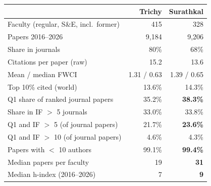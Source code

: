 \begin{tabular}{@{}lrr@{}}
\toprule
 & Trichy & Surathkal \\
\midrule
Faculty (regular, S\&E, incl.\ former) & 415 & 328 \\
Papers 2016--2026 & 9{,}184 & 9{,}206 \\
Share in journals & 80\% & 68\% \\
Citations per paper (raw) & 15.2 & 13.6 \\
Mean / median FWCI & 1.31 / 0.63 & 1.39 / 0.65 \\
Top 10\% cited (world) & 13.6\% & 14.3\% \\
Q1 share of ranked journal papers & 35.2\% & \textbf{38.3\%} \\
Share in IF $>$ 5 journals & 33.0\% & 33.8\% \\
Q1 and IF $>$ 5 (of journal papers) & 21.7\% & \textbf{23.6\%} \\
Q1 and IF $>$ 10 (of journal papers) & 4.6\% & 4.3\% \\
Papers with $<$ 10 authors & 99.1\% & \textbf{99.4\%} \\
Median papers per faculty & 19 & \textbf{31} \\
Median h-index (2016--2026) & 7 & \textbf{9} \\
\bottomrule
\end{tabular}
